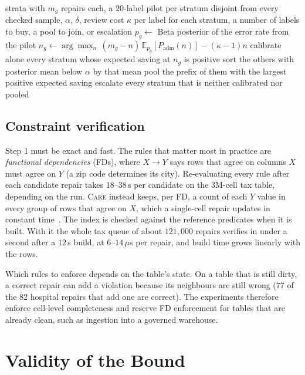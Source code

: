 \documentclass[sigconf, nonacm, balance=false]{acmart}
\theoremstyle{remark}
\begin{document}
\begin{algorithm}[t]
\caption{Planning the labels of one batch}
\label{alg:plan}
\small
\begin{algorithmic}[1]
\Require strata with $m_g$ repairs each, a $20$-label pilot per stratum disjoint
  from every checked sample, $\alpha$,
  $\delta$, review cost $\kappa$ per label
\Ensure for each stratum, a number of labels to buy, a pool to join, or escalation
  \State $p_g\gets$ Beta posterior of the error rate from the pilot
  \State $n_g\gets\arg\max_n\,(m_g-n)\,\mathbb{E}_{p_g}[P_{\mathrm{adm}}(n)]-(\kappa-1)n$
\EndFor
\State calibrate alone every stratum whose expected saving at $n_g$ is positive
\State sort the others with posterior mean below $\alpha$ by that mean
\State pool the prefix of them with the largest positive expected saving
\State escalate every stratum that is neither calibrated nor pooled
\end{algorithmic}
\end{algorithm}

\subsection{Constraint verification}
\label{sec:scalable}

Step 1 must be exact and fast. The rules that matter most in practice are
\emph{functional dependencies} (FDs), where $X\to Y$ says rows that agree on columns
$X$ must agree on $Y$ (a zip code determines its city). Re-evaluating every rule after
each candidate repair takes $18$--$38$\,s per candidate on the $3$M-cell tax table,
depending on the run. \textsc{Care}
instead keeps, per FD, a count of each $Y$ value in every group of rows that agree on
$X$, which a single-cell repair updates in constant
time~\cite{ceri1990deriving}. The index is checked against the reference predicates
when it is built. With it the whole tax queue of about $121{,}000$ repairs verifies in under a
second after a $12$\,s build, at $6$--$14$\,$\mu$s per repair, and build time grows
linearly with the rows.

Which rules to enforce depends on the table's state. On a table that is still dirty, a
correct repair can add a violation because its neighbours are still wrong ($77$ of the
$82$ hospital repairs that add one are correct). The experiments therefore enforce
cell-level completeness and reserve FD enforcement for tables that are already clean,
such as ingestion into a governed warehouse.

\section{Validity of the Bound}
\label{sec:theory}
\end{document}
